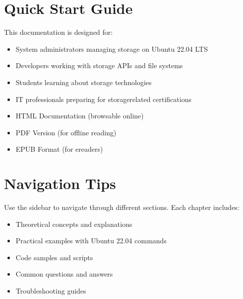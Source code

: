 \documentclass[letterpaper,10pt,english]{sphinxmanual}
\begin{document}
\chapter{Quick Start Guide}
\label{\detokenize{index:quick-start-guide}}
\sphinxAtStartPar
This documentation is designed for:
\begin{itemize}
\item {} 
\sphinxAtStartPar
System administrators managing storage on Ubuntu 22.04 LTS

\item {} 
\sphinxAtStartPar
Developers working with storage APIs and file systems

\item {} 
\sphinxAtStartPar
Students learning about storage technologies

\item {} 
\sphinxAtStartPar
IT professionals preparing for storage\sphinxhyphen{}related certifications

\end{itemize}

\sphinxAtStartPar
{}
\begin{itemize}
\item {} 
\sphinxAtStartPar
HTML Documentation (browsable online)

\item {} 
\sphinxAtStartPar
PDF Version (for offline reading)

\item {} 
\sphinxAtStartPar
EPUB Format (for e\sphinxhyphen{}readers)

\end{itemize}


\chapter{Navigation Tips}
\label{\detokenize{index:navigation-tips}}
\sphinxAtStartPar
Use the sidebar to navigate through different sections. Each chapter includes:
\begin{itemize}
\item {} 
\sphinxAtStartPar
Theoretical concepts and explanations

\item {} 
\sphinxAtStartPar
Practical examples with Ubuntu 22.04 commands

\item {} 
\sphinxAtStartPar
Code samples and scripts

\item {} 
\sphinxAtStartPar
Common questions and answers

\item {} 
\sphinxAtStartPar
Troubleshooting guides

\end{itemize}
\end{document}
